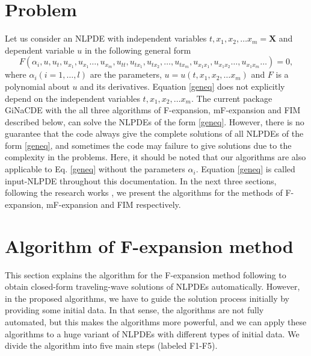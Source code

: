 \documentclass[prd,aps,floats,showkeys,nofootinbib,notitlepage]{revtex4-2}
\begin{document}
	\section{Problem}
	\par Let us consider an NLPDE with independent variables $t,x_1,x_2, \ldots x_m=\mathbf{X}$ and dependent variable $u$ in the following general form
	\begin{equation}\label{geneq}
		F\left( {\alpha_i,u,u_t,u_{x_1},u_{x_1} \ldots ,u_{x_m},u_{tt},u_{t{x_1}},u_{t{x_2}}, \ldots ,u_{t{x_m}},u_{{x_1}{x_1}},u_{{x_1}{x_2}} \ldots ,u_{{x_1}{x_m}} \ldots } \right) = 0,
	\end{equation}
	where $\alpha_i(i=1,\ldots,l)$ are the parameters, $u=u(t,x_1,x_2, \ldots x_m)$ and $F$ is a polynomial about $u$ and its derivatives. Equation \eqref{geneq} does not explicitly depend on the independent variables $t,x_1,x_2, \ldots x_m$. The current package GiNaCDE with the all three algorithms of F-expansion, mF-expansion and FIM described below, can solve the NLPDEs of the form \eqref{geneq}. However, there is no guarantee that the code always give the complete solutions of all NLPDEs of the form \eqref{geneq}, and sometimes the code may failure to give solutions due to the complexity in the problems. Here, it should be noted that our algorithms are also applicable to Eq. \eqref{geneq} without the parameters $\alpha_i$. Equation \eqref{geneq} is called input-NLPDE throughout this documentation. In the next three sections, following the research works \cite{fexpn024,fexpn024_1,fexpn123,0246,234,modfexpn,fim0,fim,mirza,complexTwt1}, we present the algorithms for the methods of F-expansion, mF-expansion and FIM respectively.  
	
	\section{Algorithm of F-expansion method}\label{sec:Fexpn}
	This section explains the algorithm for the F-expansion method following \cite{fexpn024,fexpn024_1,fexpn123,0246,234} to obtain closed-form traveling-wave solutions of NLPDEs automatically. However, in the proposed algorithms, we have to guide the solution process initially by providing some initial data. In that sense, the algorithms are not fully automated, but this makes the algorithms more powerful, and we can apply these algorithms to a huge variant of NLPDEs with different types of initial data.
	We divide the algorithm into five main steps (labeled F1-F5).  
	
\end{document}
